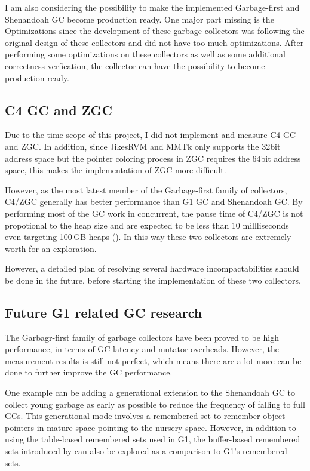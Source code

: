 I am also considering the possibility to make the implemented Garbage-first
and Shenandoah GC become production ready. One major part missing is the Optimizations
since the development of these garbage collectors was following the original design
of these collectors and did not have too much optimizations. After performing some
optimizations on these collectors as well as some additional correctness verfication,
the collector can have the possibility to become production ready.

\subsection{C4 GC and ZGC}

Due to the time scope of this project, I did not implement and measure C4 GC and ZGC.
In addition, since JikesRVM and MMTk only supports the 32bit address space but the pointer
coloring process in ZGC requires the 64bit address space, this makes the implementation
of ZGC more difficult.

However, as the most latest member of the Garbage-first family of collectors, C4/ZGC
generally has better performance than G1 GC and Shenandoah GC. By performing most of the
GC work in concurrent, the pause time of C4/ZGC is not propotional to the heap size and
are expected to be less than 10 millliseconds even targeting 100\,GB heaps (\cite{liden_karlsson_2018}).
In this way these two collectors are extremely worth for an exploration.

However, a detailed plan of resolving several hardware incompactabilities should be done in the future,
before starting the implementation of these two collectors.

\subsection{Future G1 related GC research}

The Garbagr-first family of garbage collectors have been proved to be high performance,
in terms of GC latency and mutator overheads. However, the measurement results is still
not perfect, which means there are a lot more can be done to further improve the
GC performance.

One example can be adding a generational extension to the Shenandoah GC to collect
young garbage as early as possible to reduce the frequency of falling to full GCs.
This generational mode involves a remembered set to remember object pointers in mature
space pointing to the nursery space. However, in addition to using the table-based remembered
sets used in G1, the buffer-based remembered sets introduced by \cite{blackburn2008immix} can
also be explored as a comparison to G1's remembered sets.

